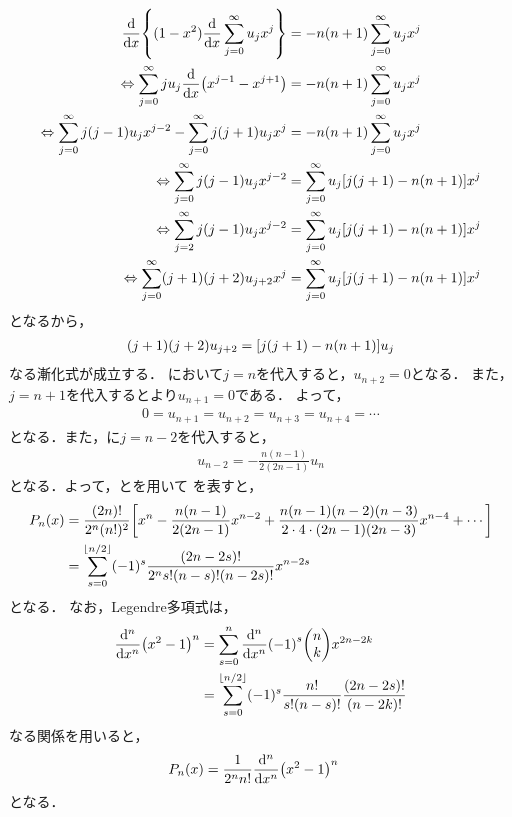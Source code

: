 \documentclass{report}
\begin{document}
    \begin{align}
      \dv{x}\qty{(1 - x^2)\dv{x}\sum_{j = 0}^{\infty}u_jx^j} &= -n(n + 1)\sum_{j = 0}^{\infty}u_jx^j \\ 
      \Leftrightarrow \sum_{j = 0}^{\infty}ju_j\dv{x}\qty(x^{j - 1} - x^{j + 1}) &= -n(n + 1)\sum_{j = 0}^{\infty}u_jx^j \\ 
      \Leftrightarrow \sum_{j = 0}^{\infty}j(j - 1)u_jx^{j - 2} - \sum_{j = 0}^{\infty}j(j + 1)u_jx^j &= -n(n + 1)\sum_{j = 0}^{\infty}u_jx^j \\ 
      \Leftrightarrow \sum_{j = 0}^{\infty}j(j - 1)u_jx^{j - 2} &= \sum_{j = 0}^{\infty}u_j\qty[j(j + 1) - n(n + 1)]x^j \\ 
      \Leftrightarrow \sum_{j = 2}^{\infty}j(j - 1)u_jx^{j - 2} &= \sum_{j = 0}^{\infty}u_j\qty[j(j + 1) - n(n + 1)]x^j \\ 
      \Leftrightarrow \sum_{j = 0}^{\infty}(j + 1)(j + 2)u_{j + 2}x^{j} &= \sum_{j = 0}^{\infty}u_j\qty[j(j + 1) - n(n + 1)]x^j 
    \end{align}
    となるから，
    \begin{align}
      (j + 1)(j + 2)u_{j + 2} = \qty[j(j + 1) - n(n + 1)]u_j\label{legendre-polynominal-u-expantion-recurr}
    \end{align}
    なる漸化式が成立する．
    において$j = n$を代入すると，$u_{n + 2} = 0$となる．
    また，$j = n + 1$を代入するとより$u_{n + 1} = 0$である．
    よって，
    \begin{align}
      0 = u_{n + 1} = u_{n + 2} = u_{n + 3} = u_{n + 4} = \cdots 
    \end{align}
    となる．また，に$j = n - 2$を代入すると，
    \begin{align}
      u_{n - 2} = -\frac{n(n - 1)}{2(2n - 1)}u_n\label{legendre-polynominal-u-expantion-recurr-2}
    \end{align}
    となる．よって，とを用いて
    を表すと，
    \begin{align}
      P_n(x) &= \frac{(2n)!}{2^n(n!)^2}\qty[x^n - \frac{n(n - 1)}{2(2n - 1)}x^{n - 2} + \frac{n(n - 1)(n - 2)(n - 3)}{2\cdot 4\cdot (2n - 1)(2n - 3)}x^{n - 4} + \cdots] \\ 
      &= \sum_{s = 0}^{\lfloor n/2 \rfloor}(-1)^s \frac{(2n - 2s)!}{2^ns!(n - s)!(n - 2s)!}x^{n - 2s}
    \end{align}
    となる．
    なお，Legendre多項式は，
    \begin{align}
      \dv[n]{x}\qty(x^2 - 1)^n &= \sum_{s = 0}^{n}\dv[n]{x}(-1)^s\mqty(n \\ k)x^{2n - 2k} \\ 
      &= \sum_{s = 0}^{\lfloor n/2 \rfloor}(-1)^s\frac{n!}{s!(n - s)!}\frac{(2n - 2s)!}{(n - 2k)!}
    \end{align}
    なる関係を用いると，
    \begin{align}
      P_n(x) &= \frac{1}{2^nn!}\dv[n]{x}\qty(x^2 - 1)^n\label{legendre-pn-easy}
    \end{align}
    となる．
\end{document}
